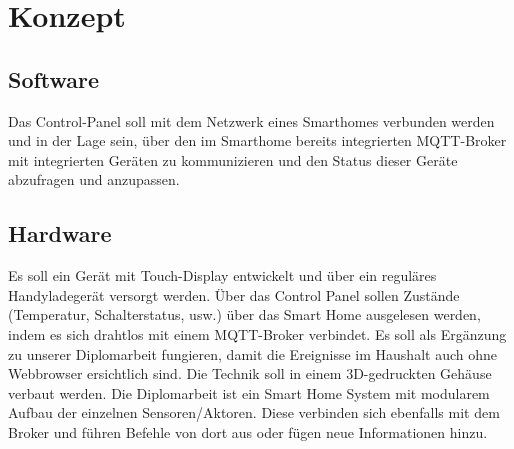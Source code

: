 \chapter{Konzept}
    \section{Software}
        Das Control-Panel soll mit dem Netzwerk eines Smarthomes
        verbunden werden und in der Lage sein, über den im Smarthome 
        bereits integrierten MQTT-Broker mit integrierten Geräten zu 
        kommunizieren und den Status dieser Geräte abzufragen und anzupassen.


    \section{Hardware}
        Es soll ein Gerät mit Touch-Display entwickelt und über ein reguläres 
        Handyladegerät versorgt werden. Über das Control Panel sollen Zustände 
        (Temperatur, Schalterstatus, usw.) über das Smart Home ausgelesen werden, 
        indem es sich drahtlos mit einem MQTT-Broker verbindet. Es soll als 
        Ergänzung zu unserer Diplomarbeit fungieren, damit die Ereignisse im 
        Haushalt auch ohne Webbrowser ersichtlich sind. Die Technik soll in
        einem 3D-gedruckten Gehäuse verbaut werden. Die Diplomarbeit ist ein 
        Smart Home System mit modularem Aufbau der einzelnen Sensoren/Aktoren. 
        Diese verbinden sich ebenfalls mit dem Broker und führen Befehle
        von dort aus oder fügen neue Informationen hinzu.
        
        